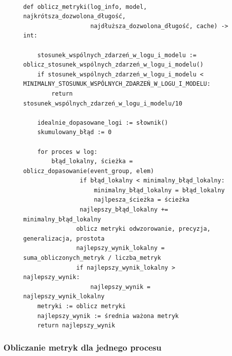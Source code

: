 \begin{figure}[!ht]
\lstset{caption=Obliczanie metryk, captionpos=b}
\lstset{label=src:best_result, frame=single}
\begin{lstlisting}

def oblicz_metryki(log_info, model, najkrótsza_dozwolona_długość, 
				   najdłuższa_dozwolona_długość, cache) -> int:
	
	stosunek_wspólnych_zdarzeń_w_logu_i_modelu := oblicz_stosunek_wspólnych_zdarzeń_w_logu_i_modelu()		   
	if stosunek_wspólnych_zdarzeń_w_logu_i_modelu < MINIMALNY_STOSUNUK_WSPÓLNYCH_ZDARZEŃ_W_LOGU_I_MODELU:
        return stosunek_wspólnych_zdarzeń_w_logu_i_modelu/10
        
    idealnie_dopasowane_logi := słownik()
    skumulowany_błąd := 0
    
	for proces w log:
      	błąd_lokalny, ścieżka = oblicz_dopasowanie(event_group, elem)
      			if błąd_lokalny < minimalny_błąd_lokalny:
          			minimalny_błąd_lokalny = błąd_lokalny
          			najlpesza_ścieżka = ścieżka
  				najlepszy_błąd_lokalny += minimalny_błąd_lokalny
               oblicz metryki odwzorowanie, precyzja, generalizacja, prostota 
               najlepszy_wynik_lokalny = suma_obliczonych_metryk / liczba_metryk
               if najlepszy_wynik_lokalny > najlepszy_wynik:
                   najlepszy_wynik = najlepszy_wynik_lokalny
	metryki := oblicz metryki 
	najlepszy_wynik := średnia ważona metryk
    return najlepszy_wynik
\end{lstlisting}
\end{figure}

\subsubsection{Obliczanie metryk dla jednego procesu}

